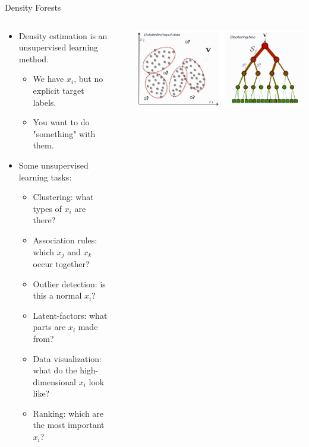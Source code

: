 \documentclass[11pt,aspectratio=1610,usenames,dvipsnames]{beamer} %
\begin{document}
\begin{frame}{Density Forests}
\begin{columns}
	\begin{column}{0.49\textwidth}
			\begin{itemize}
			\item Density estimation is an unsupervised learning method.
			\begin{itemize}
				\item We have $ x_{i} $, but no explicit target labels.
				\item You want to do "something" with them.
			\end{itemize}
			\item Some unsupervised learning tasks:
			\begin{itemize}
				\item Clustering: what types of $x_{i}$ are there?
				\item Association rules: which $ x_{j} $ and $ x_{k} $ occur together?
				\item Outlier detection: is this a normal $x_{i}$?
				\item Latent-factors: what parts are $x_{i}$ made from?
				\item Data visualization: what do the high-dimensional $x_{i}$ look like?
				\item Ranking: which are the most important $x_{i}$?
			\end{itemize}
		\end{itemize}
	\end{column}
	~
	\begin{column}{0.49\textwidth}
		
	\includegraphics[scale = 0.55]{figures/decisionForests-39.pdf}
		
	\end{column}
	
\end{columns}
\end{frame}
\end{document}
